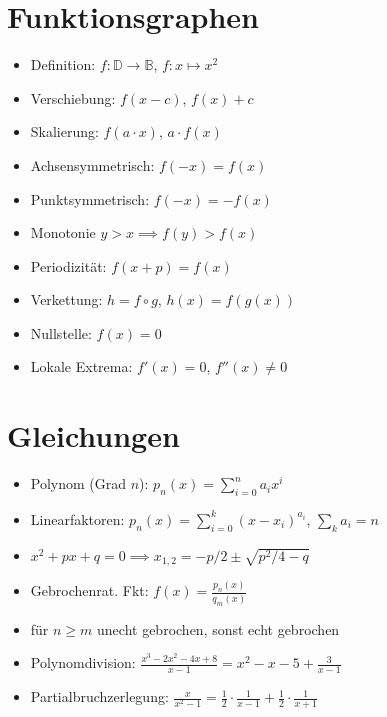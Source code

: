 \documentclass[a4paper,10pt]{article}
\begin{document}
\begin{multicols}{2}
\section {Funktionsgraphen}
\begin{itemize}
\item Definition: $f: \mathbb{D}  \to \mathbb{B}$, $f: x \mapsto x^2$
\item Verschiebung: $f(x-c)$, $f(x)+c$
\item Skalierung: $f(a\cdot x)$, $a\cdot f(x)$
\item Achsensymmetrisch: $f(-x) = f(x)$
\item Punktsymmetrisch: $f(-x) = -f(x)$
\item Monotonie $y > x \implies f(y) > f(x)$
\item Periodizität: $f(x+p) = f(x)$
\item Verkettung: $h = f \circ g$, $h(x) = f(g(x))$
\item Nullstelle: $f(x) = 0$
\item Lokale Extrema: $f'(x) = 0$, $f''(x) \ne 0$
\end{itemize}

\section {Gleichungen}
\begin{itemize}
\item Polynom (Grad $n$): $p_n(x)=\sum_{i=0}^n a_i x^i$
\item Linearfaktoren: $p_n(x) = \sum_{i=0}^k (x-x_i)^{a_i}$, $\sum_k a_i = n$
\item $x^2+px+q=0 \implies x_{1,2} = -p/2 \pm \sqrt{p^2/4-q}$
\item Gebrochenrat. Fkt: $f(x) = \frac{p_n(x)}{q_m(x)}$
\item für $n\ge m$ unecht gebrochen, sonst echt gebrochen
\item Polynomdivision: $\frac{x^3-2x^2-4x+8}{x-1} = x^2-x-5 + \frac{3}{x-1}$
\item Partialbruchzerlegung: $\frac{x}{x^2-1} = \frac{1}{2}\cdot\frac{1}{x-1} + \frac{1}{2}\cdot\frac{1}{x+1}$
\end{itemize}



\end{multicols}
\end{document}
